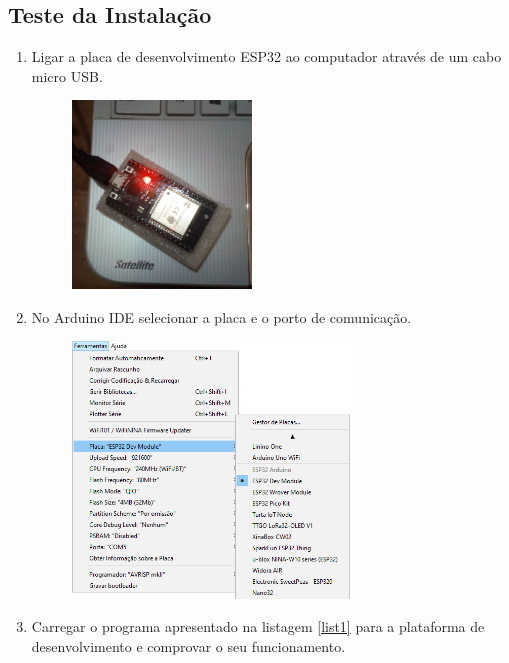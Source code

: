 \documentclass{article}
\begin{document}
\subsection{Teste da Instalação}
\begin{enumerate}
\item 
Ligar a placa de desenvolvimento ESP32 ao computador através de um cabo micro USB.
\begin{figure}[htb!]
\centering
\includegraphics[width=0.45\textwidth]{Figuras/Fig7.png}
\label{fig:fig7}
\end{figure}
\item
No Arduino IDE selecionar a placa e o porto de comunicação.
\begin{figure}[htb!]
\centering
\includegraphics[width=0.7\textwidth]{Figuras/Fig6.png}
\label{fig:fig6}
\end{figure}
\item
Carregar o programa apresentado na listagem \ref{list1} para a plataforma de desenvolvimento e comprovar o seu funcionamento.



\end{enumerate}
\end{document}
